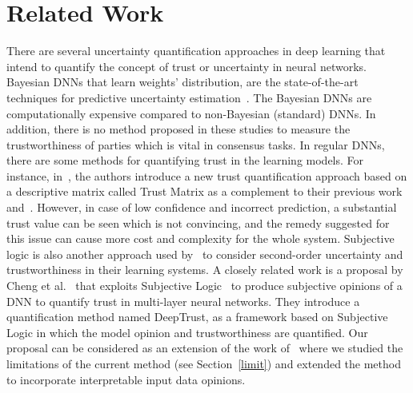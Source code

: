 \section{Related Work}
\label{relw}
There are several uncertainty quantification approaches in deep learning that intend to quantify the concept of trust or uncertainty in neural networks. Bayesian DNNs that learn weights' distribution, are the state-of-the-art techniques for predictive uncertainty estimation~\cite{uncer1,dropout,ensemble,uncer_baseline,clara}. The Bayesian DNNs are computationally expensive compared to non-Bayesian (standard) DNNs. 
In addition, there is no method proposed in these studies to measure the trustworthiness of parties which is vital in consensus tasks. In regular DNNs, there are some methods for quantifying trust in the learning models. For instance, in~\cite{break}, the authors introduce a new trust quantification approach based on a descriptive matrix called Trust Matrix as a complement to their previous work~\cite{wong1} and~\cite{wong2}. However, in case of low confidence and incorrect prediction, a substantial trust value can be seen which is not convincing, and the remedy suggested for this issue can cause more cost and complexity for the whole system. Subjective logic is also another approach used by~\cite{reput_uncer,uncer2,uncer3} to consider second-order uncertainty and trustworthiness in their learning systems. A closely related work is a proposal by Cheng et al.~\cite{hope} that exploits Subjective Logic~\cite{sl} to produce subjective opinions of a DNN to quantify trust in multi-layer neural networks. They introduce a quantification method named DeepTrust, as a framework based on Subjective Logic in which the model opinion and trustworthiness are quantified. Our proposal can be considered as an extension of the work of~\cite{hope} where we studied the limitations of the current method (see Section~\ref{limit}) and extended the method to incorporate interpretable input data opinions.  





